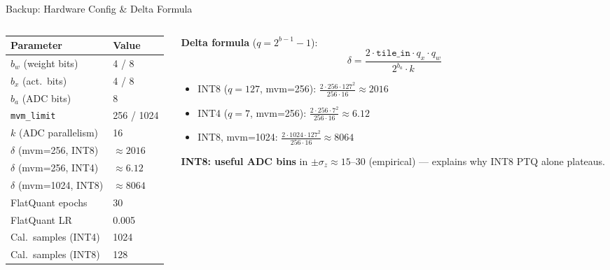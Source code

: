 \begin{frame}[shrink=20]{Backup: Hardware Config \& Delta Formula}
  \begin{columns}[T]
    \begin{column}{0.45\textwidth}
      \begin{center}
      \small
      \begin{tabular}{ll}
        \toprule
        Parameter & Value \\
        \midrule
        $b_w$ (weight bits)   & 4 / 8 \\
        $b_x$ (act.\ bits)    & 4 / 8 \\
        $b_a$ (ADC bits)      & 8 \\
        \texttt{mvm\_limit}   & 256 / 1024 \\
        $k$ (ADC parallelism) & 16 \\
        $\delta$ (mvm=256, INT8) & $\approx 2016$ \\
        $\delta$ (mvm=256, INT4) & $\approx 6.12$ \\
        $\delta$ (mvm=1024, INT8) & $\approx 8064$ \\
        \midrule
        FlatQuant epochs      & 30 \\
        FlatQuant LR          & 0.005 \\
        Cal.\ samples (INT4)  & 1024 \\
        Cal.\ samples (INT8)  & 128 \\
        \bottomrule
      \end{tabular}
      \end{center}
    \end{column}
    \begin{column}{0.50\textwidth}
      \textbf{Delta formula} ($q = 2^{b-1}{-}1$):
      \[
        \delta = \frac{2 \cdot \texttt{tile\_in} \cdot q_x \cdot q_w}{2^{b_a} \cdot k}
      \]
      \begin{itemize}\small
        \item INT8 ($q{=}127$, mvm=256):
              $\frac{2\cdot256\cdot127^2}{256\cdot16}\approx2016$
        \item INT4 ($q{=}7$, mvm=256):
              $\frac{2\cdot256\cdot7^2}{256\cdot16}\approx6.12$
        \item INT8, mvm=1024:
              $\frac{2\cdot1024\cdot127^2}{256\cdot16}\approx8064$
      \end{itemize}

      \vspace{0.1em}
      \textbf{INT8: useful ADC bins} in $\pm\sigma_z \approx 15$--$30$
      (empirical) — explains why INT8 PTQ alone plateaus.
    \end{column}
  \end{columns}
\end{frame}
